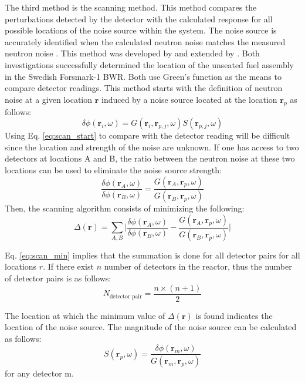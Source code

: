 The third method is the scanning method. This method compares the perturbations detected by the detector with the calculated response for all possible locations of the noise source within the system. The noise source is accurately identified when the calculated neutron noise matches the measured neutron noise \cite{demaziereIdentificationLocalizationAbsorbers2005}. This method was developed by \cite{karlssonLocalizationChannelInstability1999} and extended by \cite{demaziereDevelopmentNoisebasedMethod2002}. Both investigations successfully determined the location of the unseated fuel assembly in the Swedish Forsmark-1 BWR. Both use Green’s function as the means to compare detector readings.
This method starts with the definition of neutron noise at a given location $\textbf{r}$ induced by a noise source located at the location $\textbf{r}_p$ as follows:
\begin{equation}\label{eq:scan_start}
    \delta \phi (\textbf{r}_{i}, \omega) = G(\textbf{r}_{i}, \textbf{r}_{p,j},\omega) S(\textbf{r}_{p,j},\omega)
\end{equation}
Using Eq. \ref{eq:scan_start} to compare with the detector reading will be difficult since the location and strength of the noise are unknown. If one has access to two detectors at locations A and B, the ratio between the neutron noise at these two locations can be used to eliminate the noise source strength:
\begin{equation}
    \frac{\delta \phi (\textbf{r}_{A}, \omega)}{\delta \phi (\textbf{r}_{B}, \omega)} = \frac{G(\textbf{r}_{A}, \textbf{r}_{p},\omega)}{G(\textbf{r}_{B}, \textbf{r}_{p},\omega)}
\end{equation}
Then, the scanning algorithm consists of minimizing the following:
\begin{equation}\label{eq:scan_min}
    \Delta(\textbf{r}) = \sum_{A,B} \biggl| \frac{\delta \phi (\textbf{r}_{A}, \omega)}{\delta \phi (\textbf{r}_{B}, \omega)} - \frac{G(\textbf{r}_{A}, \textbf{r}_{p},\omega)}{G(\textbf{r}_{B}, \textbf{r}_{p},\omega)} \biggr|
\end{equation}

Eq. \ref{eq:scan_min} implies that the summation is done for all detector pairs for all locations $r$. If there exist $n$ number of detectors in the reactor, thus the number of detector pairs is as follows:
\begin{equation}
    N_{\text{detector pair}} = \frac{n \times (n+1)}{2}
\end{equation}

The location at which the minimum value of $\Delta(\textbf{r})$ is found indicates the location of the noise source. The magnitude of the noise source can be calculated as follows:
\begin{equation} \label{eq:scan_source}
    S(\textbf{r}_{p},\omega) = \frac{\delta \phi (\textbf{r}_{m}, \omega)}{G(\textbf{r}_{m}, \textbf{r}_{p},\omega)}
\end{equation}
for any detector m.


